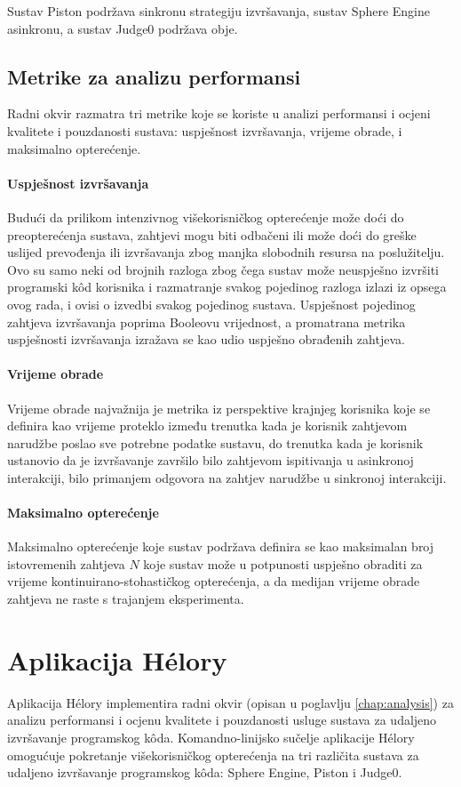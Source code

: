 \documentclass[times, utf8, diplomski]{fer}
\begin{document}
Sustav Piston podržava sinkronu strategiju izvršavanja, sustav Sphere Engine asinkronu, a sustav Judge0 podržava obje.

\section{Metrike za analizu performansi}
Radni okvir razmatra tri metrike koje se koriste u analizi performansi i ocjeni kvalitete i pouzdanosti sustava: uspješnost izvršavanja, vrijeme obrade, i maksimalno opterećenje.

\subsubsection{Uspješnost izvršavanja}
Budući da prilikom intenzivnog višekorisničkog opterećenje može doći do preopterećenja sustava, zahtjevi mogu biti odbačeni ili može doći do greške uslijed prevođenja ili izvršavanja zbog manjka slobodnih resursa na poslužitelju. Ovo su samo neki od brojnih razloga zbog čega sustav može neuspješno izvršiti programski kôd korisnika i razmatranje svakog pojedinog razloga izlazi iz opsega ovog rada, i ovisi o izvedbi svakog pojedinog sustava. Uspješnost pojedinog zahtjeva izvršavanja poprima Booleovu vrijednost, a promatrana metrika uspješnosti izvršavanja izražava se kao udio uspješno obrađenih zahtjeva.

\subsubsection{Vrijeme obrade}
Vrijeme obrade  najvažnija je metrika iz perspektive krajnjeg korisnika koje se definira kao vrijeme proteklo između trenutka kada je korisnik zahtjevom narudžbe poslao sve potrebne podatke sustavu, do trenutka kada je korisnik ustanovio da je izvršavanje završilo bilo zahtjevom ispitivanja u asinkronoj interakciji, bilo primanjem odgovora na zahtjev narudžbe u sinkronoj interakciji.

\subsubsection{Maksimalno opterećenje}
Maksimalno opterećenje koje sustav podržava definira se kao maksimalan broj istovremenih zahtjeva $N$ koje sustav može u potpunosti uspješno obraditi za vrijeme kontinuirano-stohastičkog opterećenja, a da medijan vrijeme obrade zahtjeva ne raste s trajanjem eksperimenta.

\chapter{Aplikacija Hélory}
\label{chap:helory}
Aplikacija Hélory implementira radni okvir (opisan u poglavlju \ref{chap:analysis}) za analizu performansi i ocjenu kvalitete i pouzdanosti usluge sustava za udaljeno izvršavanje programskog kôda. Komandno-linijsko sučelje aplikacije Hélory omogućuje pokretanje višekorisničkog opterećenja na tri različita sustava za udaljeno izvršavanje programskog kôda: Sphere Engine, Piston i Judge0.
\end{document}
